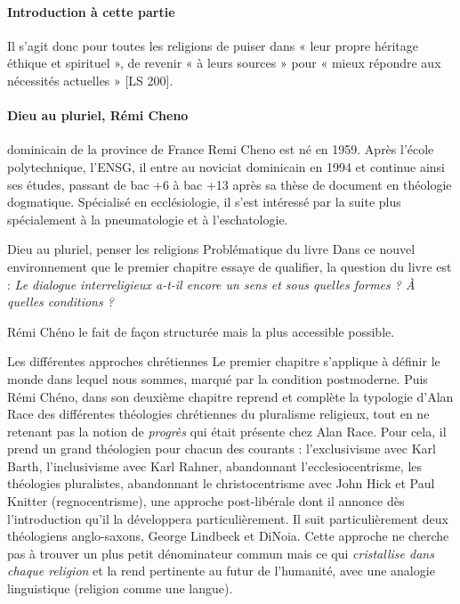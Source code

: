\paragraph{Introduction à cette partie}
\begin{singlequote}
    Il s’agit donc pour toutes les religions de puiser dans « leur propre héritage éthique et spirituel », de revenir « à leurs sources » pour « mieux répondre aux nécessités actuelles » [LS 200].
\end{singlequote}

\paragraph{Dieu au pluriel, Rémi Cheno} \cite{cheno_dieu_2017}   
 

{dominicain de la province de France} Remi Cheno est né en 1959. Après l'école polytechnique, l'ENSG, il entre au noviciat dominicain en 1994 et continue ainsi ses études, passant de bac +6 à bac +13 après sa thèse de document en théologie dogmatique. Spécialisé en ecclésiologie, il s’est intéressé par la suite plus spécialement à la pneumatologie et à l’eschatologie. 

 


 

{Dieu au pluriel, penser les religions}
{Problématique du livre} Dans ce nouvel environnement que le premier chapitre essaye de qualifier, la question du livre est : \textit{Le dialogue interreligieux a-t-il encore un sens et sous quelles formes ? À quelles conditions ?} 

Rémi Chéno le fait de façon structurée mais la plus accessible possible. 

{Les différentes approches chrétiennes} Le premier chapitre s'applique à définir le monde dans lequel nous sommes, marqué par la condition postmoderne. Puis Rémi Chéno, dans son deuxième chapitre reprend et complète la typologie d'Alan Race des différentes théologies chrétiennes du pluralisme religieux, tout en ne retenant pas la notion de \textit{progrès} qui était présente chez Alan Race. Pour cela, il prend un grand théologien pour chacun des courants : l'exclusivisme avec Karl Barth, l'inclusivisme avec Karl Rahner, abandonnant l'ecclesiocentrisme, les théologies pluralistes, abandonnant le christocentrisme avec John Hick et Paul Knitter (regnocentrisme), une approche post-libérale dont il annonce dès l'introduction qu'il la développera particulièrement. Il suit particulièrement deux théologiens anglo-saxons,  George Lindbeck \cite{lindbeck_nature_2002}   et DiNoia. Cette approche ne cherche pas à trouver un plus petit dénominateur commun mais ce qui \textit{cristallise dans chaque religion} et la rend pertinente au futur de l'humanité, avec une analogie linguistique (religion comme une langue). 


